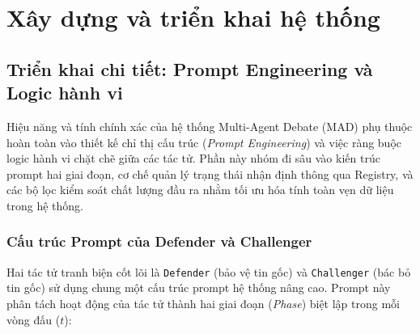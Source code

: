 \documentclass[12pt,a4paper]{report}
\begin{document}
\chapter{Xây dựng và triển khai hệ thống}

\section{Triển khai chi tiết: Prompt Engineering và Logic hành vi}
Hiệu năng và tính chính xác của hệ thống Multi-Agent Debate (MAD) phụ thuộc hoàn toàn vào thiết kế chỉ thị cấu trúc (\textit{Prompt Engineering}) và việc ràng buộc logic hành vi chặt chẽ giữa các tác tử. Phần này nhóm đi sâu vào kiến trúc prompt hai giai đoạn, cơ chế quản lý trạng thái nhận định thông qua Registry, và các bộ lọc kiểm soát chất lượng đầu ra nhằm tối ưu hóa tính toàn vẹn dữ liệu trong hệ thống.

\subsection{Cấu trúc Prompt của Defender và Challenger}
Hai tác tử tranh biện cốt lõi là \texttt{Defender} (bảo vệ tin gốc) và \texttt{Challenger} (bác bỏ tin gốc) sử dụng chung một cấu trúc prompt hệ thống nâng cao. Prompt này phân tách hoạt động của tác tử thành hai giai đoạn (\textit{Phase}) biệt lập trong mỗi vòng đấu ($t$):
\end{document}

